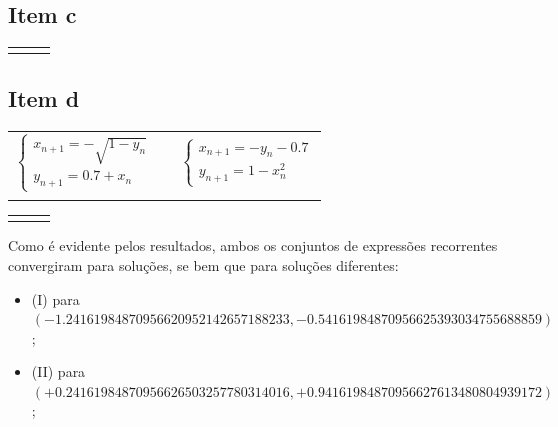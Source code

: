 \subsection{Item c}

\begin{center}
\begin{tabular}{ p{73mm} p{0mm} p{73mm} }
	 & &
	
\end{tabular}
\end{center}

\newpage
\subsection{Item d}
\begin{center}
\begin{tabular}{ p{73mm} p{0mm} p{73mm} }
	\begin{equation*}
		\begin{cases}
			x_{n+1}=-\sqrt{1-y_n}\\
			y_{n+1}=0.7+x_n
		\end{cases}
	\end{equation*} & &
	\begin{equation*}
		\begin{cases}
			x_{n+1}=-y_n-0.7\\
			y_{n+1}=1-x_n^2
		\end{cases}
	\end{equation*} \\
	 & &
	 \\
\end{tabular}
\end{center}

\newpage
\begin{center}
\begin{tabular}{ p{73mm} p{0mm} p{73mm} }
	 & &
	
\end{tabular}
\end{center}
Como é evidente pelos resultados, ambos os conjuntos de expressões recorrentes convergiram para soluções, se bem que para soluções diferentes:
\begin{itemize}
	\item (I) para $(-1.24161984870956620952142657188233, -0.54161984870956625393034755688859)$;
	\item (II) para $(+0.24161984870956626503257780314016, +0.94161984870956627613480804939172)$;
\end{itemize}
